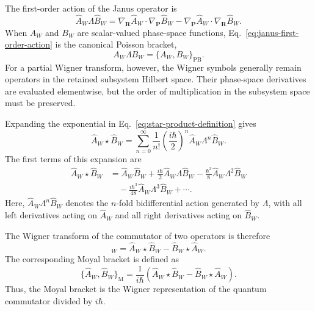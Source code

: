 \documentclass[
  11pt,
  letterpaper,
  onehalfspacing,
  normalmargins,
  equalmargins,
  oneside
]{ut-thesis}
\begin{document}
The first-order action of the Janus operator is
\begin{equation}
\hat A_W\Lambda\hat B_W
=
\nabla_{\mathbf R}\hat A_W\cdot
\nabla_{\mathbf P}\hat B_W
-
\nabla_{\mathbf P}\hat A_W\cdot
\nabla_{\mathbf R}\hat B_W.
\label{eq:janus-first-order-action}
\end{equation}
When \(A_W\) and \(B_W\) are scalar-valued phase-space functions,
Eq.~\eqref{eq:janus-first-order-action} is the canonical Poisson bracket,
\begin{equation}
A_W\Lambda B_W
=
\{A_W,B_W\}_{\mathrm{PB}}.
\label{eq:janus-poisson-bracket-relation}
\end{equation}
For a partial Wigner transform, however, the Wigner symbols generally remain
operators in the retained subsystem Hilbert space. Their phase-space
derivatives are evaluated elementwise, but the order of multiplication in the
subsystem space must be preserved.

Expanding the exponential in Eq.~\eqref{eq:star-product-definition} gives
\begin{equation}
\hat A_W\star\hat B_W
=
\sum_{n=0}^{\infty}
\frac{1}{n!}
\left(
\frac{i\hbar}{2}
\right)^n
\hat A_W\Lambda^n\hat B_W.
\label{eq:star-product-series}
\end{equation}
The first terms of this expansion are
\begin{align}
\hat A_W\star\hat B_W
&=
\hat A_W\hat B_W
+
\frac{i\hbar}{2}
\hat A_W\Lambda\hat B_W
-
\frac{\hbar^2}{8}
\hat A_W\Lambda^2\hat B_W
\nonumber\\
&\quad
-
\frac{i\hbar^3}{48}
\hat A_W\Lambda^3\hat B_W
+
\cdots .
\label{eq:star-product-expansion}
\end{align}
Here, \(\hat A_W\Lambda^n\hat B_W\) denotes the \(n\)-fold bidifferential
action generated by \(\Lambda\), with all left derivatives acting on
\(\hat A_W\) and all right derivatives acting on \(\hat B_W\).

The Wigner transform of the commutator of two operators is therefore
\begin{equation}
[\hat A,\hat B]_W
=
\hat A_W\star\hat B_W
-
\hat B_W\star\hat A_W.
\label{eq:wigner-commutator-star}
\end{equation}
The corresponding Moyal bracket is defined as
\begin{equation}
\{\hat A_W,\hat B_W\}_{\mathrm M}
=
\frac{1}{i\hbar}
\left(
\hat A_W\star\hat B_W
-
\hat B_W\star\hat A_W
\right).
\label{eq:moyal-bracket-definition}
\end{equation}
Thus, the Moyal bracket is the Wigner representation of the quantum
commutator divided by \(i\hbar\).
\end{document}
